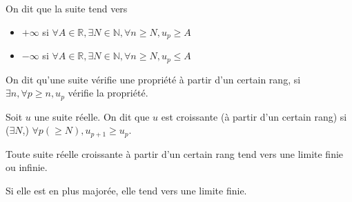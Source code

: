 \documentclass[french]{yLectureNote}
\newcommand{\N}[0]{\mathbb{N}}
\newcommand{\R}[0]{\mathbb{R}}
\begin{document}
\begin{definition}
On dit que la suite tend vers \begin{itemize}
                               \item $+\infty$ si $\forall A\in\R,\exists N\in\N, \forall n\geq N, u_p \geq A$
                               \item $-\infty$ si $\forall A\in\R,\exists N\in\N, \forall n\geq N, u_p \leq A$
                              \end{itemize}

\end{definition}
\begin{definition}
On dit qu'une suite vérifie une propriété à partir d'un certain rang, si $\exists n, \forall p\geq n, u_p$ vérifie la propriété.
\end{definition}
\begin{definition}
Soit $u$ une suite réelle. On dit que $u$ est croissante (à partir d'un certain rang) si ($\exists N$,) $\forall p (\geq N), u_{p+1} \geq u_p$.
\end{definition}
\begin{proposition}
Toute suite réelle croissante à partir d'un certain rang tend vers une limite finie ou infinie.

Si elle est en plus majorée, elle tend vers une limite finie.
\end{proposition}
\end{document}
